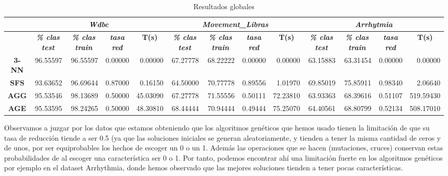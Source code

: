 \documentclass[a4paper,11pt]{article}
\begin{document}
  \begin{table}[H]
  \caption{Resultados globales}
  \begin{adjustbox}{width=1.1\textwidth}
  \begin{tabular}{|c|r|r|r|r|r|r|r|r|r|r|r|r|}
  \hline
  \multicolumn{1}{|l|}{} & \multicolumn{ 4}{c|}{\textbf{\textit{Wdbc}}} & \multicolumn{ 4}{c|}{\textbf{\textit{Movement\_Libras}}} & \multicolumn{ 4}{c|}{\textbf{\textit{Arrhytmia}}} \\ \hline
  \multicolumn{1}{|l|}{} & \multicolumn{1}{c|}{\textbf{\textit{\% clas test}}} & \multicolumn{1}{c|}{\textbf{\textit{\% clas train}}} & \multicolumn{1}{c|}{\textbf{\textit{tasa red}}} & \multicolumn{1}{c|}{\textbf{T(s)}} & \multicolumn{1}{c|}{\textbf{\textit{\% clas test}}} & \multicolumn{1}{c|}{\textbf{\textit{\% clas train}}} & \multicolumn{1}{c|}{\textbf{\textit{tasa red}}} & \multicolumn{1}{c|}{\textbf{T(s)}} & \multicolumn{1}{c|}{\textbf{\textit{\% clas test}}} & \multicolumn{1}{c|}{\textbf{\textit{\% clas train}}} & \multicolumn{1}{c|}{\textbf{\textit{tasa red}}} & \multicolumn{1}{c|}{\textbf{T(s)}} \\ \hline
  \textbf{3-NN} & 96.55597 & 96.55597 & 0.00000 & 0.00000 & 67.27778 & 68.22222 & 0.00000 & 0.00000 & 63.15883 & 63.31454 & 0.00000 & 0.00000 \\ \hline
  \textbf{SFS} & 93.63652 & 96.69644 & 0.87000 & 0.16150 & 64.50000 & 70.77778 & 0.89556 & 1.01970 & 69.85019 & 75.85911 & 0.98340 & 2.06640 \\ \hline
  \textbf{AGG} & 95.53546 & 98.13689 & 0.50000 & 45.03090 & 67.27778 & 71.55556 & 0.50111 & 72.23810 & 63.93363 & 68.39616 & 0.51107 & 519.59430 \\ \hline
  \textbf{AGE} & 95.53595 & 98.24265 & 0.50000 & 48.30810 & 68.44444 & 70.94444 & 0.49444 & 75.25070 & 64.40561 & 68.80799 & 0.52134 & 508.17010 \\ \hline
  \end{tabular}
  \end{adjustbox}
  \label{all}
  \end{table}
  
  Observamos a juzgar por los datos que estamos obteniendo que los algoritmos genéticos que hemos usado tienen la limitación
  de que su tasa de reducción tiende a ser 0.5 (ya que las soluciones iniciales se generan aleatoriamente, y tienden a tener
  la misma cantidad de ceros y de unos, por ser equiprobables los hechos de escoger un 0 o un 1. Además las operaciones que se
  hacen (mutaciones, cruces) conservan estas probabilidades de al escoger una característica ser 0 o 1. Por tanto, podemos
  encontrar ahí una limitación fuerte en los algoritmos genéticos por ejemplo en el dataset Arrhythmia, donde hemos observado
  que las mejores soluciones tienden a tener pocas características.
  
\end{document}
